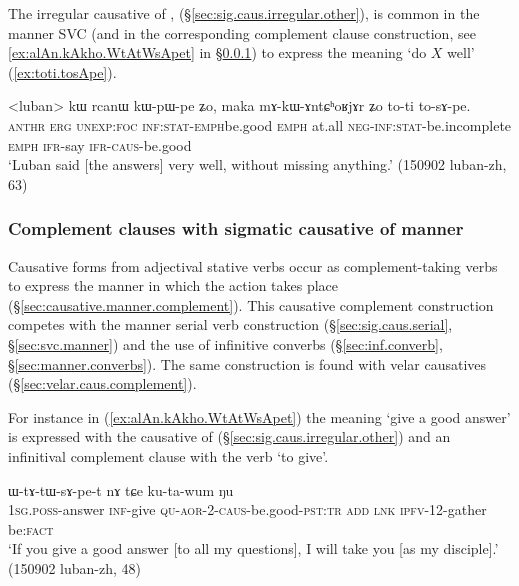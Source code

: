 The irregular causative of ,  (§\ref{sec:sig.caus.irregular.other}), is common in the manner SVC (and in the corresponding complement clause construction, see \ref{ex:alAn.kAkho.WtAtWsApet} in §\ref{sec:sig.caus.complement}) to express the meaning `do $X$ well' (\ref{ex:toti.tosApe}).

\begin{exe}
\ex \label{ex:toti.tosApe}
\gll <luban> kɯ rcanɯ kɯ-pɯ-pe ʑo, maka mɤ-kɯ-ɤntɕʰoʁjɤr ʑo to-ti to-sɤ-pe.  \\
  \textsc{anthr} \textsc{erg} \textsc{unexp}:\textsc{foc} \textsc{inf}:\textsc{stat}-\textsc{emph}\redp{}be.good \textsc{emph} at.all \textsc{neg}-\textsc{inf}:\textsc{stat}-be.incomplete \textsc{emph} \textsc{ifr}-say \textsc{ifr}-\textsc{caus}-be.good \\
\glt `Luban said [the answers] very well, without missing anything.' (150902 luban-zh, 63)
\end{exe} 



\subsubsection{Complement clauses with sigmatic causative of manner} \label{sec:sig.caus.complement}
Causative forms from adjectival stative verbs occur as complement-taking verbs to express the manner in which the action takes place (§\ref{sec:causative.manner.complement}). This causative complement construction competes with the manner serial verb construction (§\ref{sec:sig.caus.serial}, §\ref{sec:svc.manner}) and the use of infinitive converbs (§\ref{sec:inf.converb}, §\ref{sec:manner.converbs}). The same construction is found with velar causatives (§\ref{sec:velar.caus.complement}).

For instance in (\ref{ex:alAn.kAkho.WtAtWsApet}) the meaning `give a good answer' is expressed with the causative  of  (§\ref{sec:sig.caus.irregular.other}) and an infinitival complement clause with the verb  `to give'.

\begin{exe}
\ex \label{ex:alAn.kAkho.WtAtWsApet}
 ɯ-tɤ-tɯ-sɤ-pe-t nɤ tɕe ku-ta-wum ŋu \\
\textsc{1sg}.\textsc{poss}-answer \textsc{inf}-give \textsc{qu}-\textsc{aor}-2-\textsc{caus}-be.good-\textsc{pst}:\textsc{tr} \textsc{add} \textsc{lnk} \textsc{ipfv}-1\fl{}2-gather be:\textsc{fact} \\
\glt `If you give a good answer [to all my questions], I will take you [as my disciple].' (150902 luban-zh, 48)
\end{exe}

